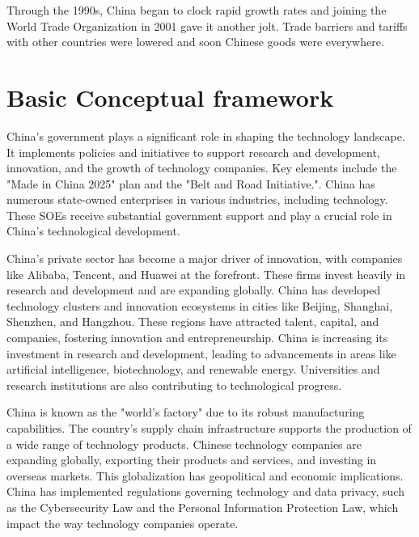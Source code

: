 Through the 1990s, China began to clock rapid growth rates and joining 
the World Trade Organization in 2001 gave it another jolt. Trade 
barriers and tariffs with other countries were lowered and soon 
Chinese goods were everywhere.

\section{Basic Conceptual framework}

China's government plays a significant role in shaping the technology 
landscape. It implements policies and initiatives to support research 
and development, innovation, and the growth of technology companies. 
Key elements include the "Made in China 2025" plan and the "Belt and 
Road Initiative.". China has numerous state-owned enterprises in various 
industries, including technology. These SOEs receive substantial 
government support and play a crucial role in China's technological 
development.

China's private sector has become a major driver of innovation, with 
companies like Alibaba, Tencent, and Huawei at the forefront. These 
firms invest heavily in research and development and are expanding 
globally. China has developed technology clusters and innovation 
ecosystems in cities like Beijing, Shanghai, Shenzhen, and Hangzhou. 
These regions have attracted talent, capital, and companies, fostering 
innovation and entrepreneurship. China is increasing its investment in 
research and development, leading to advancements in areas like artificial 
intelligence, biotechnology, and renewable energy. Universities and 
research institutions are also contributing to technological progress.

China is known as the "world's factory" due to its robust manufacturing 
capabilities. The country's supply chain infrastructure supports the 
production of a wide range of technology products. Chinese technology 
companies are expanding globally, exporting their products and services, 
and investing in overseas markets. This globalization has geopolitical 
and economic implications. China has implemented regulations governing 
technology and data privacy, such as the Cybersecurity Law and the 
Personal Information Protection Law, which impact the way technology 
companies operate.